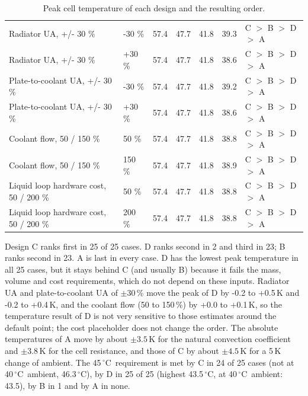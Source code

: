 \documentclass[11pt,a4paper]{article}
\newcommand{\degC}{\ensuremath{{}^{\circ}\mathrm{C}}}
\begin{document}
\begin{table}[H]
\begin{tabular}{@{}p{4.6cm}p{1.5cm}cccc>{\centering\arraybackslash}p{1.9cm}@{}}
Radiator UA, +/- 30 \% & -30 \% & 57.4 & 47.7 & 41.8 & 39.3 & C $>$ B $>$ D $>$ A \\
Radiator UA, +/- 30 \% & +30 \% & 57.4 & 47.7 & 41.8 & 38.6 & C $>$ B $>$ D $>$ A \\
Plate-to-coolant UA, +/- 30 \% & -30 \% & 57.4 & 47.7 & 41.8 & 39.2 & C $>$ B $>$ D $>$ A \\
Plate-to-coolant UA, +/- 30 \% & +30 \% & 57.4 & 47.7 & 41.8 & 38.6 & C $>$ B $>$ D $>$ A \\
Coolant flow, 50 / 150 \% & 50 \% & 57.4 & 47.7 & 41.8 & 38.8 & C $>$ B $>$ D $>$ A \\
Coolant flow, 50 / 150 \% & 150 \% & 57.4 & 47.7 & 41.8 & 38.9 & C $>$ B $>$ D $>$ A \\
Liquid loop hardware cost, 50 / 200 \% & 50 \% & 57.4 & 47.7 & 41.8 & 38.8 & C $>$ B $>$ D $>$ A \\
Liquid loop hardware cost, 50 / 200 \% & 200 \% & 57.4 & 47.7 & 41.8 & 38.8 & C $>$ B $>$ D $>$ A \\
\bottomrule
\end{tabular}
\caption{Peak cell temperature of each design and the resulting order.}
\end{table}
Design C ranks first in 25 of 25 cases. D ranks second in 2 and third in 23; B ranks second in 23. A is last in every case. D has the lowest peak temperature in all 25 cases, but it stays behind C (and usually B) because it fails the mass, volume and cost requirements, which do not depend on these inputs. Radiator UA and plate-to-coolant UA of $\pm30$\,\% move the peak of D by -0.2 to +0.5\,K and -0.2 to +0.4\,K, and the coolant flow (50 to 150\,\%) by +0.0 to +0.1\,K, so the temperature result of D is not very sensitive to those estimates around the default point; the cost placeholder does not change the order. The absolute temperatures of A move by about $\pm3.5$\,K for the natural convection coefficient and $\pm3.8$\,K for the cell resistance, and those of C by about $\pm4.5$\,K for a 5\,K change of ambient. The 45\,\degC\ requirement is met by C in 24 of 25 cases (not at 40\,\degC\ ambient, 46.3\,\degC), by D in 25 of 25 (highest 43.5\,\degC, at 40\,\degC\ ambient: 43.5), by B in 1 and by A in none.

\end{document}
